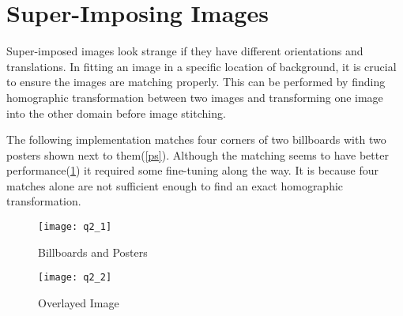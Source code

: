 \section{Super-Imposing Images}
Super-imposed images look strange if they have different orientations and translations. In fitting an image in a specific location of background, it is crucial to ensure the images are matching properly.  This can be performed by finding homographic transformation between two images and transforming one image into the other domain before image stitching.
\par 
The following implementation matches four corners of two billboards with two posters shown next to them(\ref{ps}).  Although the matching seems to have better performance(\ref{rst_1}) it required some fine-tuning along the way. It is because four matches alone are not sufficient enough to find an exact homographic transformation.

\begin{figure}[h]
    \begin{center}
        \begin{minipage}{.65\textwidth}
            \texttt{[image: q2\_1]}
            \caption{Billboards and Posters}
            \label{ps}
        \end{minipage}
        \begin{minipage}{.65\textwidth}
            \texttt{[image: q2\_2]}
            \caption{Overlayed Image}
            \label{rst_1}
        \end{minipage}
    \end{center}
\end{figure}
